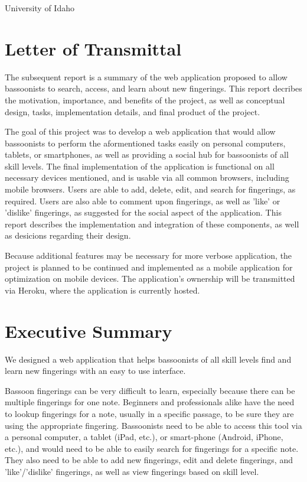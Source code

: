 \documentclass[12pt,english]{article}
\begin{document}
\noindent University of Idaho


\section{Letter of Transmittal}

The subsequent report is a summary of the web application proposed
to allow bassoonists to search, access, and learn about new fingerings.
This report decribes the motivation, importance, and benefits of the
project, as well as conceptual design, tasks, implementation details,
and final product of the project. 

The goal of this project was to develop a web application that would
allow bassoonists to perform the aformentioned tasks easily on personal
computers, tablets, or smartphones, as well as providing a social
hub for bassoonists of all skill levels. The final implementation
of the application is functional on all necessary devices mentioned,
and is usable via all common browsers, including mobile browsers.
Users are able to add, delete, edit, and search for fingerings, as
required. Users are also able to comment upon fingerings, as well
as 'like' or 'dislike' fingerings, as suggested for the social aspect
of the application. This report describes the implementation and integration
of these components, as well as desicions regarding their design.

Because additional features may be necessary for more verbose application,
the project is planned to be continued and implemented as a mobile
application for optimization on mobile devices. The application's
ownership will be transmitted via Heroku, where the application is
currently hosted. 


\section{Executive Summary}

We designed a web application that helps bassoonists of all skill
levels find and learn new fingerings with an easy to use interface.

Bassoon fingerings can be very difficult to learn, especially because
there can be multiple fingerings for one note. Beginners and professionals
alike have the need to lookup fingerings for a note, usually in a
specific passage, to be sure they are using the appropriate fingering.
Bassoonists need to be able to access this tool via a personal computer,
a tablet (iPad, etc.), or smart-phone (Android, iPhone, etc.), and
would need to be able to easily search for fingerings for a specific
note. They also need to be able to add new fingerings, edit and delete
fingerings, and 'like'/'dislike' fingerings, as well as view fingerings
based on skill level.
\end{document}
